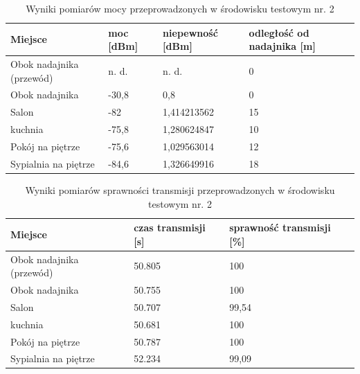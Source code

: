 \documentclass[12pt, twoside, openany]{mwrep}
\begin{document}
\begin{table}[H]
\begin{tabular}{|l|l|l|l|}
\hline
Miejsce                    & moc {[}dBm{]} & niepewność   {[}dBm{]} & odległość   od nadajnika {[}m{]} \\ \hline
Obok   nadajnika (przewód) & n. d.         & n. d.                  & 0                                \\ \hline
Obok nadajnika             & -30,8         & 0,8                    & 0                                \\ \hline
Salon                      & -82           & 1,414213562            & 15                               \\ \hline
kuchnia                    & -75,8         & 1,280624847            & 10                               \\ \hline
Pokój na   piętrze         & -75,6         & 1,029563014            & 12                               \\ \hline
Sypialnia na   piętrze     & -84,6         & 1,326649916            & 18                               \\ \hline
\end{tabular}
\caption{Wyniki pomiarów mocy przeprowadzonych w środowisku testowym nr. 2}
\end{table}

\begin{table}[H]
\begin{tabular}{|l|l|l|}
\hline
Miejsce                    & czas transmisji {[}s{]} & sprawność transmisji {[}\%{]} \\ \hline
Obok   nadajnika (przewód) & 50.805                  & 100                           \\ \hline
Obok nadajnika             & 50.755                  & 100                           \\ \hline
Salon                      & 50.707                  & 99,54                         \\ \hline
kuchnia                    & 50.681                  & 100                           \\ \hline
Pokój na   piętrze         & 50.787                  & 100                           \\ \hline
Sypialnia na   piętrze     & 52.234                  & 99,09                         \\ \hline
\end{tabular}
\caption{Wyniki pomiarów sprawności transmisji przeprowadzonych w środowisku testowym nr. 2}
\end{table}
\end{document}
